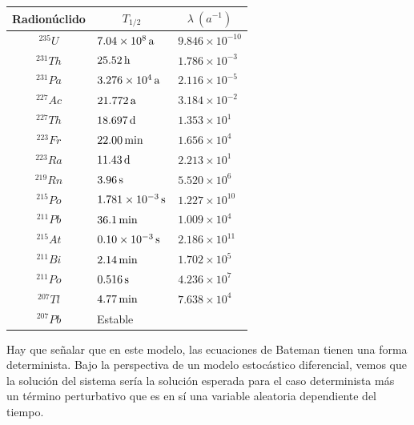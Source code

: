 \begin{center}
\noindent\begin{tabular}{|c|l|l|}
\hline
Radionúclido & \multicolumn{1}{c|}{$T_{1/2}$} & \multicolumn{1}{c|}{$\lambda\ (a^{-1})$} \\\hline\hline 
$^{235}U$  & $\unit[7.04\times 10^8]{a}$ & $9.846\times 10^{-10}$ \\
$^{231}Th$ & $\unit[25.52]{h}$ & $1.786\times 10^{-3}$ \\
$^{231}Pa$ & $\unit[3.276\times 10^4]{a}$ & $2.116\times 10^{-5}$ \\
$^{227}Ac$ & $\unit[21.772]{a}$ & $3.184\times 10^{-2}$ \\
$^{227}Th$ & $\unit[18.697]{d}$ & $1.353\times 10^{1}$ \\
$^{223}Fr$ & $\unit[22.00]{min}$ & $1.656\times 10^{4}$ \\
$^{223}Ra$ & $\unit[11.43]{d}$ & $2.213\times 10^{1}$ \\
$^{219}Rn$ & $\unit[3.96]{s}$ & $5.520\times 10^{6}$ \\
$^{215}Po$ & $\unit[1.781\times 10^{-3}]{s}$ & $1.227\times 10^{10}$ \\
$^{211}Pb$ & $\unit[36.1]{min}$ & $1.009\times 10^{4}$ \\
$^{215}At$ & $\unit[0.10\times 10^{-3}]{s}$ & $2.186\times 10^{11}$ \\
$^{211}Bi$ & $\unit[2.14]{min}$ & $1.702\times 10^{5}$ \\
$^{211}Po$ & $\unit[0.516]{s}$ & $4.236\times 10^{7}$ \\
$^{207}Tl$ & $\unit[4.77]{min}$ & $7.638\times 10^{4}$ \\
$^{207}Pb$ & Estable & \\\hline
\end{tabular}
\label{tabladeconstantesdedesintegracion}
\end{center}

Hay que señalar que en este modelo, las ecuaciones de Bateman tienen una forma determinista. Bajo la perspectiva de un modelo estocástico diferencial, vemos que la solución del sistema sería la solución esperada para el caso determinista más un término perturbativo que es en sí una variable aleatoria dependiente del tiempo. 

